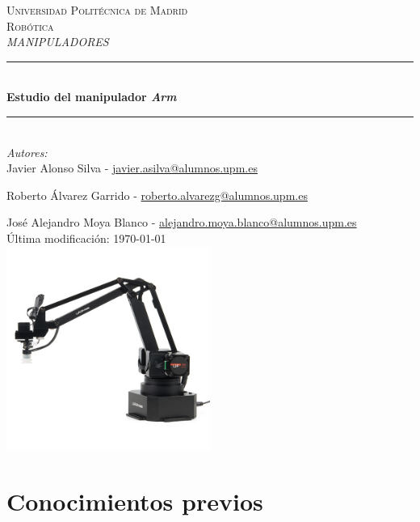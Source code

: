 \documentclass[a4paper,12pt]{article}
\begin{document}
\begin{titlepage}

    \newcommand{\HRule}{\rule{\linewidth}{0.5mm}}
    \center

    \textsc{\LARGE Universidad Politécnica de Madrid}\\[1cm]

    \textsc{\Large Robótica}\\[0.2cm]
    \textsc{\large \textit{MANIPULADORES}}\\[1cm]
    \HRule \\[0.8cm]
    { \huge \bfseries Estudio del manipulador \textit{{\textmu}Arm}}\\[0.7cm]
    \HRule \\[2cm]
    \large
    \emph{Autores:}\\
    Javier Alonso Silva - \href{mailto:javier.asilva@alumnos.upm.es}{javier.asilva@alumnos.upm.es}

    Roberto Álvarez Garrido - \href{mailto:roberto.alvarezg@alumnos.upm.es}{roberto.alvarezg@alumnos.upm.es}

    José Alejandro Moya Blanco - \href{mailto:alejandro.moya.blanco@alumnos.upm.es}{alejandro.moya.blanco@alumnos.upm.es}\\[1.5cm]
    {\large Última modificación: \today}\\[2cm]
    \includegraphics[width=0.5\textwidth]{images/uarm.jpg}\\[1cm]
\end{titlepage}

\newpage
\tableofcontents
\listoffigures
\listoftables
\newpage

\section*{Conocimientos previos}
\label{sec:previous_knowledge}
\end{document}
